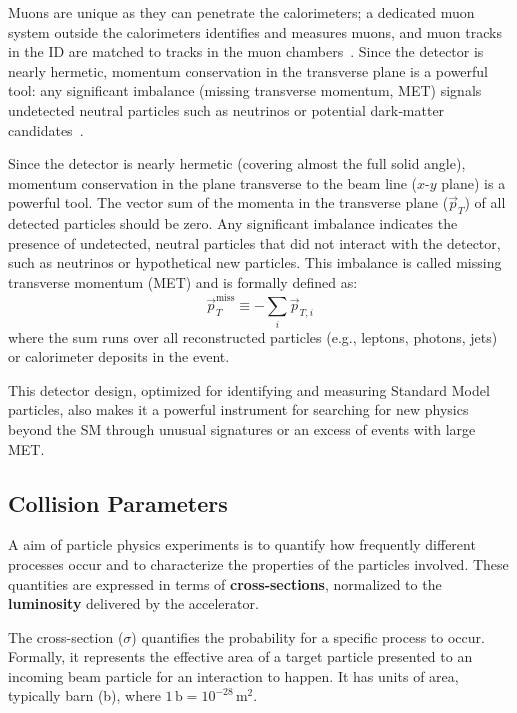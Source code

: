 Muons are unique as they can penetrate the calorimeters; a dedicated muon system outside the calorimeters identifies and measures muons, and muon tracks in the ID are matched to tracks in the muon chambers~\cite{CMS_MUON_17001,CMS:2008xjf}. Since the detector is nearly hermetic, momentum conservation in the transverse plane is a powerful tool: any significant imbalance (missing transverse momentum, MET) signals undetected neutral particles such as neutrinos or potential dark‑matter candidates~\cite{CMS:2019ctu,CMS:PF2017}.


Since the detector is nearly hermetic (covering almost the full solid angle), momentum conservation in the plane transverse to the beam line ($x$-$y$ plane) is a powerful tool. The vector sum of the momenta in the transverse plane ($\vec{p}_T$) of all detected particles should be zero. Any significant imbalance indicates the presence of undetected, neutral particles that did not interact with the detector, such as neutrinos or hypothetical new particles. This imbalance is called missing transverse momentum (MET) and is formally defined as:
$$
\vec{p}_T^{\text{miss}} \equiv -\sum_i \vec{p}_{T,i}
$$
where the sum runs over all reconstructed particles (e.g., leptons, photons, jets) or calorimeter deposits in the event.

This detector design, optimized for identifying and measuring Standard Model particles, also makes it a powerful instrument for searching for new physics beyond the SM through unusual signatures or an excess of events with large MET.

\subsection{Collision Parameters}\label{sec:cross_sec_lumi}

A aim of particle physics experiments is to quantify how frequently different processes occur and to characterize the properties of the particles involved. These quantities are expressed in terms of \textbf{cross-sections}, normalized to the \textbf{luminosity} delivered by the accelerator.


The cross-section ($\sigma$) quantifies the probability for a specific process to occur. Formally, it represents the effective area of a target particle presented to an incoming beam particle for an interaction to happen. It has units of area, typically barn (b), where $1\,\text{b} = 10^{-28}\,\text{m}^2$.

